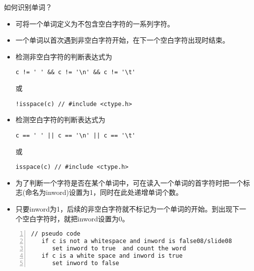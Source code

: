 \begin{frame}[fragile]\ft{\secname}
如何识别单词？ \pause \vspace{.1in}
\begin{itemize}
\item 可将一个单词定义为不包含空白字符的一系列字符。\\[0.15in]
\item 一个单词以首次遇到非空白字符开始，在下一个空白字符出现时结束。
\end{itemize}
\end{frame}

\begin{frame}[fragile]\ft{\secname}
\begin{itemize}
\item 检测非空白字符的判断表达式为
\begin{lstlisting}
c != ' ' && c != '\n' && c != '\t'
\end{lstlisting} 
或
\begin{lstlisting}
!isspace(c) // #include <ctype.h>
\end{lstlisting}\vspace{0.1in}

\item 检测空白字符的判断表达式为
\begin{lstlisting}
c == ' ' || c == '\n' || c == '\t'
\end{lstlisting}
或
\begin{lstlisting}
isspace(c) // #include <ctype.h>
\end{lstlisting}
\end{itemize}
\end{frame}

\begin{frame}[fragile]\ft{\secname}
\begin{itemize}
\item
为了判断一个字符是否在某个单词中，可在读入一个单词的首字符时把一个标志(命名为inword)设置为1，同时在此处递增单词个数。\\[.15in]
\item
只要inword为1，后续的非空白字符就不标记为一个单词的开始。到出现下一个空白字符时，就把inword设置为0。
\end{itemize}
\begin{lstlisting}[numbers=left]
// pseudo code
   if c is not a whitespace and inword is false08/slide08
      set inword to true  and count the word
   if c is a white space and inword is true
      set inword to false   
\end{lstlisting}

\end{frame}

